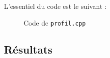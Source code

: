 \documentclass[french,a4paper,10pt]{article}
\begin{document}
	L'essentiel du code est le suivant : %
	\begin{figure}[!htb]
		\centering
		\caption{Code de \texttt{profil.cpp}}\label{Fig:profil-code}
	\end{figure}

	\subsection{R\'esultats}\label{subsec:4.1}
\end{document}
